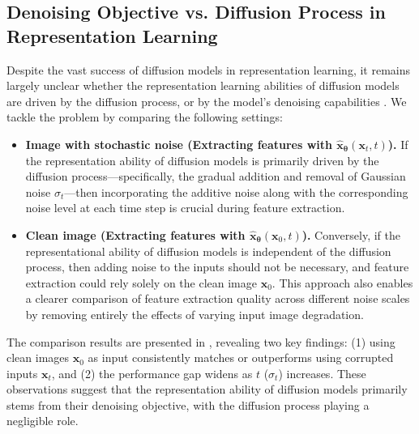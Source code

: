 {\subsection{Denoising Objective vs. Diffusion Process in Representation Learning}\label{subsec:feature-extraction}
Despite the vast success of diffusion models in representation learning, it remains largely unclear whether the representation learning abilities of diffusion models are driven by the diffusion process, or by the model’s denoising capabilities \citep{fuest2024diffusion}. We tackle the problem by comparing the following settings:
\begin{itemize}
    \item \textbf{Image with stochastic noise (Extracting features with $\hat{\bm x}_{\bm \theta}(\bm x_t, t)$).} If the representation ability of diffusion models is primarily driven by the diffusion process—specifically, the gradual addition and removal of Gaussian noise $\sigma_t$—then incorporating the additive noise along with the corresponding noise level at each time step is crucial during feature extraction. 
    \item \textbf{Clean image (Extracting features with $\hat{\bm x}_{\bm \theta}(\bm x_0, t)$).} Conversely, if the representational ability of diffusion models is independent of the diffusion process, then adding noise to the inputs should not be necessary, and feature extraction could rely solely on the clean image $\bm{x}_0$. This approach also enables a clearer comparison of feature extraction quality across different noise scales by removing entirely the effects of varying input image degradation. 
\end{itemize}

The comparison results are presented in , revealing two key findings: (1) using clean images $\bm{x}_0$ as input consistently matches or outperforms using corrupted inputs $\bm{x}_t$, and (2) the performance gap widens as $t$ ($\sigma_t$) increases. These observations suggest that the representation ability of diffusion models primarily stems from their denoising objective, with the diffusion process playing a negligible role.

}
